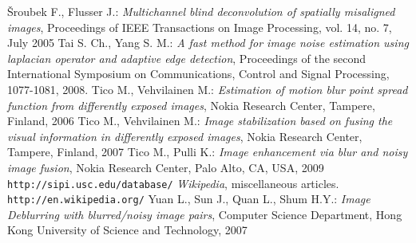 \documentclass[12pt,notitlepage]{report}
\begin{document}
\begin{thebibliography}{xxxxx-99}
 Šroubek F., Flusser J.: {\em Multichannel blind deconvolution of spatially misaligned images},	Proceedings of IEEE Transactions on Image Processing, vol. 14, no. 7, July 2005
  Tai S. Ch., Yang S. M.: {\em A fast method for image noise estimation using laplacian operator and adaptive edge detection}, Proceedings of the second International Symposium on Communications, Control and Signal Processing, 1077-1081, 2008.
 Tico M., Vehvilainen M.: {\em  Estimation of motion blur point spread function from differently exposed images}, Nokia Research Center, Tampere, Finland, 2006
 Tico M., Vehvilainen M.: {\em Image stabilization based on fusing the visual information in differently exposed images}, Nokia Research Center, Tampere, Finland, 2007
 Tico M., Pulli K.: {\em Image enhancement via blur and noisy image fusion}, Nokia Research Center, Palo Alto, CA, USA, 2009
  \\ \texttt{http://sipi.usc.edu/database/}
  {\em Wikipedia}, miscellaneous articles. \\ \texttt{http://en.wikipedia.org/}
 Yuan L., Sun J., Quan L., Shum H.Y.: {\em Image Deblurring with blurred/noisy image pairs},  Computer Science Department, Hong Kong University of Science and Technology, 2007
\end{thebibliography}
\end{document}
